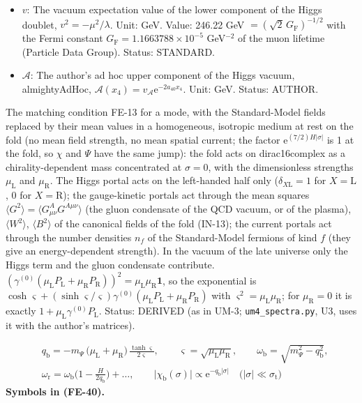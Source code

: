 \documentclass[
  10pt,
]{article}
\begin{document}
\begin{itemize}
  \(\langle J_f^\mu\rangle\) in the rest frame of the medium. Unit:
  GeV\(^3\). Status: STANDARD.
\item
  \(v\): The vacuum expectation value of the lower component of the
  Higgs doublet, \(v^2 = -\mu^2/\lambda\). Unit: GeV. Value: 246.22 GeV
  \(= (\sqrt2\,G_{\mathrm{F}})^{-1/2}\) with the Fermi constant
  \(G_{\mathrm{F}} = 1.1663788\times10^{-5}\) GeV\(^{-2}\) of the muon
  lifetime (Particle Data Group). Status: STANDARD.
\item
  \(\mathcal{A}\): The author's ad hoc upper component of the Higgs
  vacuum, almightyAdHoc,
  \(\mathcal{A}(x_4) = v_{\mathcal{A}}\mathrm{e}^{-2a_{40}x_4}\). Unit:
  GeV. Status: AUTHOR.
\end{itemize}

The matching condition FE-13 for a mode, with the Standard-Model fields
replaced by their mean values in a homogeneous, isotropic medium at rest
on the fold (no mean field strength, no mean spatial current; the factor
\(\mathrm{e}^{(7/2)H\lvert\sigma\rvert}\) is 1 at the fold, so \(\chi\)
and \(\Psi\) have the same jump): the fold acts on dirac16complex as a
chirality-dependent mass concentrated at \(\sigma = 0\), with the
dimensionless strengths \(\mu_{\mathrm{L}}\) and \(\mu_{\mathrm{R}}\).
The Higgs portal acts on the left-handed half only
(\(\delta_{X\mathrm{L}} = 1\) for \(X = \mathrm{L}\), 0 for
\(X = \mathrm{R}\)); the gauge-kinetic portals act through the mean
squares \(\langle G^2\rangle = \langle G^A_{\mu\nu}G^{A\mu\nu}\rangle\)
(the gluon condensate of the QCD vacuum, or of the plasma),
\(\langle W^2\rangle\), \(\langle B^2\rangle\) of the canonical fields
of the fold (IN-13); the current portals act through the number
densities \(n_f\) of the Standard-Model fermions of kind \(f\) (they
give an energy-dependent strength). In the vacuum of the late universe
only the Higgs term and the gluon condensate contribute.
\((\gamma^{(0)}(\mu_{\mathrm{L}}P_{\mathrm{L}} + \mu_{\mathrm{R}}P_{\mathrm{R}}))^2 = \mu_{\mathrm{L}}\mu_{\mathrm{R}}\mathbf{1}\),
so the exponential is
\(\cosh\varsigma + (\sinh\varsigma/\varsigma)\gamma^{(0)}(\mu_{\mathrm{L}}P_{\mathrm{L}} + \mu_{\mathrm{R}}P_{\mathrm{R}})\)
with \(\varsigma^2 = \mu_{\mathrm{L}}\mu_{\mathrm{R}}\); for
\(\mu_{\mathrm{R}} = 0\) it is exactly
\(1 + \mu_{\mathrm{L}}\gamma^{(0)}P_{\mathrm{L}}\). Status: DERIVED (as
in UM-3; \texttt{um4\_spectra.py}, U3, uses it with the author's
matrices).

\[
\begin{aligned}
&q_{\mathrm{b}} = -m_\Psi\,\big(\mu_{\mathrm{L}} + \mu_{\mathrm{R}}\big)\,\frac{\tanh\varsigma}{2\varsigma},\qquad \varsigma = \sqrt{\mu_{\mathrm{L}}\mu_{\mathrm{R}}},\qquad
\omega_{\mathrm{b}} = \sqrt{m_\Psi^2 - q_{\mathrm{b}}^2},\\
&\omega_{\mathrm{r}} = \omega_{\mathrm{b}}\Big(1 - \frac{H}{2q_{\mathrm{b}}}\Big) + \dots,\qquad
\lvert\chi_{\mathrm{b}}(\sigma)\rvert \propto \mathrm{e}^{-q_{\mathrm{b}}\lvert\sigma\rvert}\quad\big(\lvert\sigma\rvert \ll \sigma_{\mathrm{t}}\big)
\end{aligned} \tag{FE-40}
\] \textbf{Symbols in (FE-40).}
\end{document}
